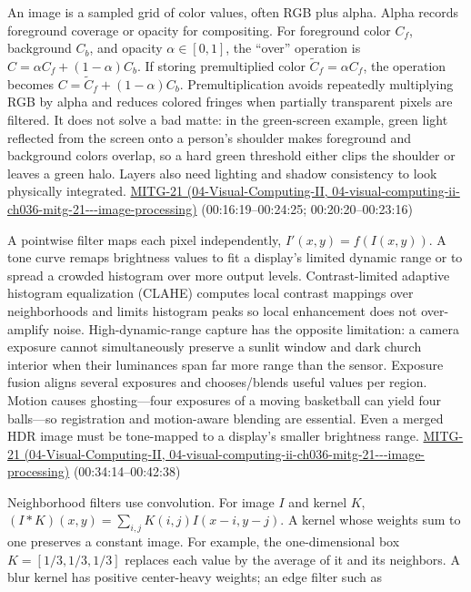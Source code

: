 An image is a sampled grid of color values, often RGB plus alpha. Alpha records foreground coverage or opacity for compositing. For foreground color \(C_f\), background \(C_b\), and opacity \(\alpha\in[0,1]\), the ``over'' operation is \(C=\alpha C_f+(1-\alpha)C_b\). If storing premultiplied color \(\tilde C_f=\alpha C_f\), the operation becomes \(C=\tilde C_f+(1-\alpha)C_b\). Premultiplication avoids repeatedly multiplying RGB by alpha and reduces colored fringes when partially transparent pixels are filtered. It does not solve a bad matte: in the green-screen example, green light reflected from the screen onto a person's shoulder makes foreground and background colors overlap, so a hard green threshold either clips the shoulder or leaves a green halo. Layers also need lighting and shadow consistency to look physically integrated. \href{../04-Visual-Computing-II/main.pdf\#nameddest=04-visual-computing-ii-ch036-mitg-21---image-processing}{MITG-21 (04-Visual-Computing-II, 04-visual-computing-ii-ch036-mitg-21-\/-\/-image-processing)} (00:16:19--00:24:25; 00:20:20--00:23:16)

A pointwise filter maps each pixel independently, \(I'(x,y)=f(I(x,y))\). A tone curve remaps brightness values to fit a display's limited dynamic range or to spread a crowded histogram over more output levels. Contrast-limited adaptive histogram equalization (CLAHE) computes local contrast mappings over neighborhoods and limits histogram peaks so local enhancement does not over-amplify noise. High-dynamic-range capture has the opposite limitation: a camera exposure cannot simultaneously preserve a sunlit window and dark church interior when their luminances span far more range than the sensor. Exposure fusion aligns several exposures and chooses/blends useful values per region. Motion causes ghosting---four exposures of a moving basketball can yield four balls---so registration and motion-aware blending are essential. Even a merged HDR image must be tone-mapped to a display's smaller brightness range. \href{../04-Visual-Computing-II/main.pdf\#nameddest=04-visual-computing-ii-ch036-mitg-21---image-processing}{MITG-21 (04-Visual-Computing-II, 04-visual-computing-ii-ch036-mitg-21-\/-\/-image-processing)} (00:34:14--00:42:38)

Neighborhood filters use convolution. For image \(I\) and kernel \(K\), \((I*K)(x,y)=\sum_{i,j}K(i,j)I(x-i,y-j)\). A kernel whose weights sum to one preserves a constant image. For example, the one-dimensional box \(K=[1/3,1/3,1/3]\) replaces each value by the average of it and its neighbors. A blur kernel has positive center-heavy weights; an edge filter such as

